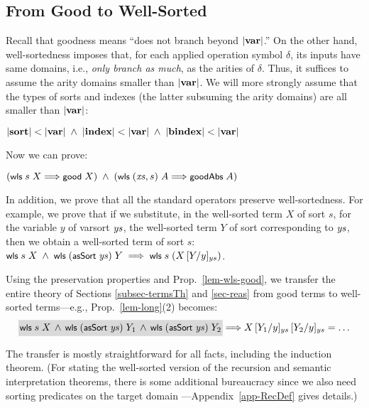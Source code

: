 \documentclass{llncs}
\newcommand\coll[1]{\mbox{\colorbox{light-gray}{$\!#1\!$}}}
\begin{document}
\subsection{From Good to Well-Sorted}
\label{subsec-goodToSort}
  
Recall that goodness means ``does not branch beyond $|\mbox{\bf var}|$.'' On the other hand, 
well-sortedness imposes that, for each applied operation symbol $\delta$, 
its inputs have same domains, 
i.e., {\em  only branch as much}, as the arities of $\delta$. Thus, it suffices 
to assume the arity domains smaller than $|\mbox{\bf var}|$. 
We will more strongly assume that the types of sorts and indexes 
(the latter subsuming the arity domains) 
are 
all smaller than $|\mbox{\bf var}|$: 

\begin{ass}\rm \label{ass-varLarge}
$|\mbox{\bf sort}| < |\mbox{\bf var}| \;\wedge\; |\mbox{\bf index}| < |\mbox{\bf var}| \;\wedge\; |\mbox{\bf bindex}| < |\mbox{\bf var}|$ 
\end{ass}

Now we can prove:
%
\begin{prop} \label{lem-wls-good}
$(\mbox{\rm\textsf{\small wls}}\;s\;X \Longrightarrow \mbox{\rm\textsf{\small good}}\;X) \;\wedge\; (\mbox{\rm\textsf{\small wls}}\;(\mbox{\textit{xs}},s)\;A \Longrightarrow \mbox{\rm\textsf{\small goodAbs}}\;A)$
\end{prop}

In addition, we prove that all the standard operators preserve well-sortedness. 
For example, we prove that if we substitute, in the well-sorted term $X$ of sort $s$, 
for the variable $y$ of varsort $\mbox{\textit{ys}}$, the well-sorted term $Y$ of sort 
corresponding to $\mbox{\textit{ys}}$, then we obtain a well-sorted term of sort $s$: 
%
$\mbox{\rm\textsf{\small wls}}\;s\;X \;\wedge\; \mbox{\rm\textsf{\small wls}}\;(\mbox{\rm\textsf{\small asSort}}\;\mbox{\textit{ys}})\;Y \;\Longrightarrow\; \mbox{\rm\textsf{\small wls}}\;s\;(X\,[Y/y]_{ys})$. 

Using the preservation properties and 
Prop.~\ref{lem-wls-good}, we transfer the entire  
theory %
of Sections \ref{subsec-termsTh} and \ref{sec-reas} from good terms to well-sorted terms---e.g., 
Prop.~\ref{lem-long}(2) becomes: 
%
$$
\begin{array}{c}
\coll{\wls\;s\;X \,\wedge\, \wls\;(\asSort\;\ys)\;Y_1 \,\wedge\, \wls\;(\asSort\;\ys)\;Y_2} 
\Lra
X\,[Y_1 / y]_{ys}\,[Y_2 / y]_{ys} = \ldots %
\end{array}
$$

The transfer is mostly straightforward for all facts, including the induction theorem. 
(For stating the well-sorted version of the recursion and semantic interpretation theorems, 
there is some additional bureaucracy since we also need sorting predicates on the target domain%
---Appendix~\ref{app-RecDef} gives details.) 
\end{document}
